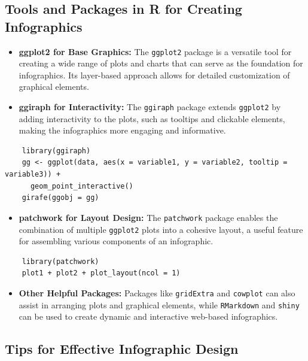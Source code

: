 \documentclass[
]{book}
\providecommand{\tightlist}{%
  \setlength{\itemsep}{0pt}\setlength{\parskip}{0pt}}
\begin{document}
\hypertarget{tools-and-packages-in-r-for-creating-infographics}{%
\subsection{Tools and Packages in R for Creating Infographics}\label{tools-and-packages-in-r-for-creating-infographics}}

\begin{itemize}
\item
  \textbf{ggplot2 for Base Graphics:} The \texttt{ggplot2} package is a versatile tool for creating a wide range of plots and charts that can serve as the foundation for infographics. Its layer-based approach allows for detailed customization of graphical elements.
\item
  \textbf{ggiraph for Interactivity:} The \texttt{ggiraph} package extends \texttt{ggplot2} by adding interactivity to the plots, such as tooltips and clickable elements, making the infographics more engaging and informative.
\end{itemize}

\begin{verbatim}
    library(ggiraph)
    gg <- ggplot(data, aes(x = variable1, y = variable2, tooltip = variable3)) + 
      geom_point_interactive() 
    girafe(ggobj = gg)
\end{verbatim}

\begin{itemize}
\tightlist
\item
  \textbf{patchwork for Layout Design:} The \texttt{patchwork} package enables the combination of multiple \texttt{ggplot2} plots into a cohesive layout, a useful feature for assembling various components of an infographic.
\end{itemize}

\begin{verbatim}
    library(patchwork)
    plot1 + plot2 + plot_layout(ncol = 1)
\end{verbatim}

\begin{itemize}
\tightlist
\item
  \textbf{Other Helpful Packages:} Packages like \texttt{gridExtra} and \texttt{cowplot} can also assist in arranging plots and graphical elements, while \texttt{RMarkdown} and \texttt{shiny} can be used to create dynamic and interactive web-based infographics.
\end{itemize}

\hypertarget{tips-for-effective-infographic-design}{%
\subsection{Tips for Effective Infographic Design}\label{tips-for-effective-infographic-design}}
\end{document}
